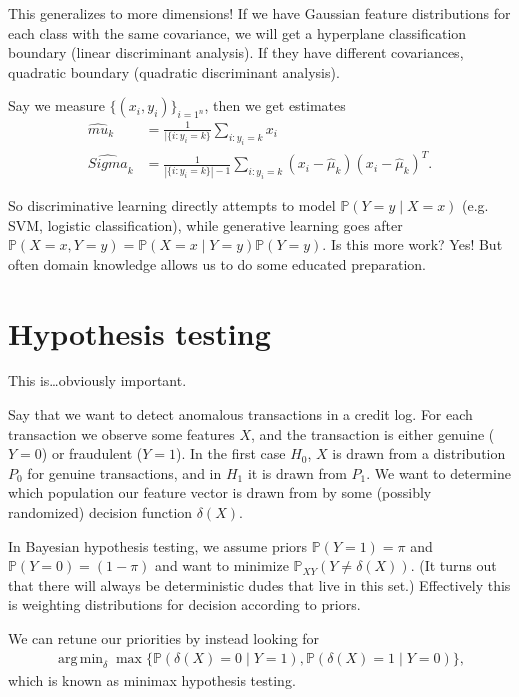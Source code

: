 \documentclass[11pt,letterpaper]{article}
\DeclareMathOperator*{\argmin}{arg\,min}
\theoremstyle{definition}
\theoremstyle{plain}
\numberwithin{equation}{section}
\numberwithin{figure}{section}
\begin{document}
This generalizes to more dimensions! If we have Gaussian feature distributions for each class with the same covariance, we will get a hyperplane classification boundary (linear discriminant analysis). If they have different covariances, quadratic boundary (quadratic discriminant analysis).

Say we measure $\{(x_i,y_i)\}_{i=1^n}$, then we get estimates
%
\begin{align}
	\hat{mu}_k &= \frac{1}{|\{i : y_i = k\}} \sum_{i:y_i=k} x_i\\
	\hat{Sigma}_k &= \frac{1}{|\{i:y_i = k\}|-1} \sum_{i:y_i = k} (x_i - \hat{\mu}_k)(x_i - \hat{\mu}_k)^T.
\end{align}

So discriminative learning directly attempts to model $\mathbb{P}(Y=y \mid X=x)$ (e.g. SVM, logistic classification), while generative learning goes after $\mathbb{P}(X=x,Y=y) = \mathbb{P}(X=x\mid Y=y) \mathbb{P}(Y=y)$. Is this more work? Yes! But often domain knowledge allows us to do some educated preparation.













\section{Hypothesis testing}
This is\ldots obviously important.

Say that we want to detect anomalous transactions in a credit log. For each transaction we observe some features $X$, and the transaction is either genuine ($Y=0$) or fraudulent ($Y=1$). In the first case $H_0$, $X$ is drawn from a distribution $P_0$ for genuine transactions, and in $H_1$ it is drawn from $P_1$. We want to determine which population our feature vector is drawn from by some (possibly randomized) decision function $\delta(X)$.

In Bayesian hypothesis testing, we assume priors $\mathbb{P}(Y=1) = \pi$ and $\mathbb{P}(Y=0) = (1-\pi)$ and want to minimize $\mathbb{P}_{XY}(Y \neq \delta(X))$. (It turns out that there will always be deterministic dudes that live in this set.) Effectively this is weighting distributions for decision according to priors.


We can retune our priorities by instead looking for
%
\begin{align}
	\argmin_\delta \max\{\mathbb{P}(\delta(X) = 0\mid Y=1), \mathbb{P}(\delta(X) =1 \mid Y=0)\},
\end{align}
%
which is known as minimax hypothesis testing.
\end{document}

